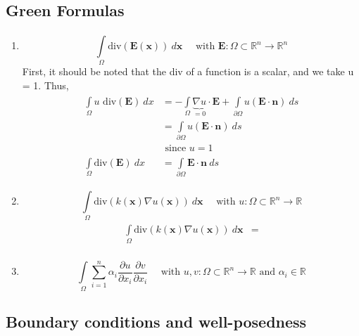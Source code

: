 \subsection{Green Formulas}
\label{subsec:Green Formulas}
\begin{enumerate}
    \item \[
            \int\limits_{\Omega}^{ } \text{div}\left( \boldsymbol{E} (\boldsymbol{x})
            \right) \ d\boldsymbol{x} \quad \text{ with } \boldsymbol{E} : \Omega \subset
            \mathbb{R}^n \to \mathbb{R}^n
    \]
First, it should be noted that the div of a function is a scalar, and we take u = 1. Thus, 
\begin{align*}
    \int\limits_{\Omega}^{ } u \text{ div}(\boldsymbol{E}) \ dx &= - \int\limits_{\Omega}^{ }
    \underbrace{\nabla u}_{=0} \cdot \boldsymbol{E} + \int\limits_{ \partial \Omega }^{ } u \left(
\boldsymbol{E} \cdot \boldsymbol{n} \right) \ ds \\
 &= \int\limits_{ \partial \Omega} u \left( \boldsymbol{E} \cdot \boldsymbol{n}  \right) \
 ds\\ 
 &\text{ since } u = 1\\
    \int\limits_{\Omega}^{ } \text{div} \left( \boldsymbol{E} \right) \ dx &= \int\limits_{
 \partial \Omega}^{ } \boldsymbol{E} \cdot \boldsymbol{n} \ ds 
\end{align*}

\item \[
        \int\limits_{\Omega}^{ } \text{div}\left( k(\boldsymbol{x}) \nabla
        u(\boldsymbol{x})   \right) \ d\boldsymbol{x} 
        \quad \text{ with } u : \Omega \subset \mathbb{R}^n\to \mathbb{R}
\]
\begin{align*}
    \int\limits_{\Omega}^{ } \text{div}\left( k(\boldsymbol{x} ) \nabla u(\boldsymbol{x} )
    \right) \ d\boldsymbol{x}   &=  \\ 
\end{align*}

\item 
    \[
    \int\limits_{\Omega}^{} \sum_{i=1}^{n} \alpha_i \frac{ \partial u }{ \partial x_i }
    \frac{ \partial v  }{ \partial x_i } \quad \text{ with } u,v : \Omega \subset
    \mathbb{R}^n \to \mathbb{R} \text{ and } \alpha_i \in \mathbb{R} 
    \]
\end{enumerate}


\subsection{Boundary conditions and well-posedness}
\label{subsec:Boundary conditions and well-posedness}

